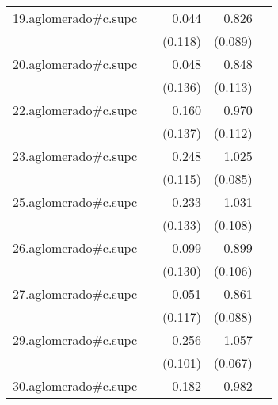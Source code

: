 {\begin{longtable}{l*{4}{D{.}{.}{-1}}}
\addlinespace
19.aglomerado#c.supc&                     &       0.044         &       0.826\sym{***}&                     \\
            &                     &     (0.118)         &     (0.089)         &                     \\
\addlinespace
20.aglomerado#c.supc&                     &       0.048         &       0.848\sym{***}&                     \\
            &                     &     (0.136)         &     (0.113)         &                     \\
\addlinespace
22.aglomerado#c.supc&                     &       0.160         &       0.970\sym{***}&                     \\
            &                     &     (0.137)         &     (0.112)         &                     \\
\addlinespace
23.aglomerado#c.supc&                     &       0.248\sym{*}  &       1.025\sym{***}&                     \\
            &                     &     (0.115)         &     (0.085)         &                     \\
\addlinespace
25.aglomerado#c.supc&                     &       0.233         &       1.031\sym{***}&                     \\
            &                     &     (0.133)         &     (0.108)         &                     \\
\addlinespace
26.aglomerado#c.supc&                     &       0.099         &       0.899\sym{***}&                     \\
            &                     &     (0.130)         &     (0.106)         &                     \\
\addlinespace
27.aglomerado#c.supc&                     &       0.051         &       0.861\sym{***}&                     \\
            &                     &     (0.117)         &     (0.088)         &                     \\
\addlinespace
29.aglomerado#c.supc&                     &       0.256\sym{*}  &       1.057\sym{***}&                     \\
            &                     &     (0.101)         &     (0.067)         &                     \\
\addlinespace
30.aglomerado#c.supc&                     &       0.182         &       0.982\sym{***}&                     \\

\end{longtable}}
